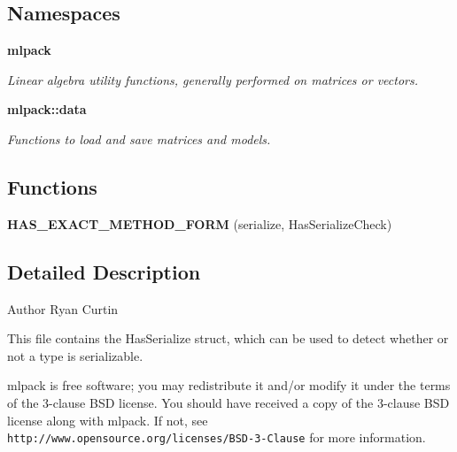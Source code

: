 \subsection*{Namespaces}
\begin{DoxyCompactItemize}
\item 
 \textbf{ mlpack}
\begin{DoxyCompactList}\small\item\em Linear algebra utility functions, generally performed on matrices or vectors. \end{DoxyCompactList}\item 
 \textbf{ mlpack\+::data}
\begin{DoxyCompactList}\small\item\em Functions to load and save matrices and models. \end{DoxyCompactList}\end{DoxyCompactItemize}
\subsection*{Functions}
\begin{DoxyCompactItemize}
\item 
\textbf{ H\+A\+S\+\_\+\+E\+X\+A\+C\+T\+\_\+\+M\+E\+T\+H\+O\+D\+\_\+\+F\+O\+RM} (serialize, Has\+Serialize\+Check)
\end{DoxyCompactItemize}


\subsection{Detailed Description}
\begin{DoxyAuthor}{Author}
Ryan Curtin
\end{DoxyAuthor}
This file contains the Has\+Serialize struct, which can be used to detect whether or not a type is serializable.

mlpack is free software; you may redistribute it and/or modify it under the terms of the 3-\/clause B\+SD license. You should have received a copy of the 3-\/clause B\+SD license along with mlpack. If not, see {\tt http\+://www.\+opensource.\+org/licenses/\+B\+S\+D-\/3-\/\+Clause} for more information. 